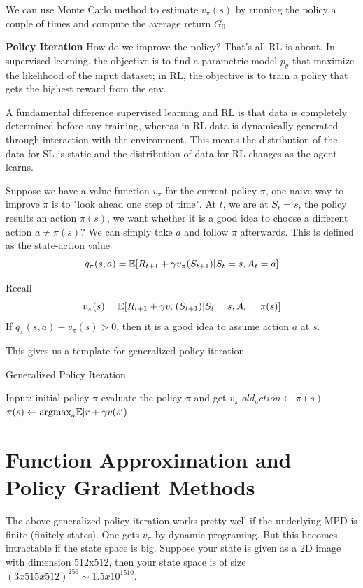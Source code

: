 \documentclass{article}
\begin{document}
We can use Monte Carlo method to estimate $v_{\pi}(s)$ by running the 
policy a couple of times and compute the average return $G_0$. 


\textbf{Policy Iteration} How do we improve the policy? That's all RL is 
about. In supervised learning, the objective is to find a parametric
model $p_{\theta}$ that maximize the likelihood of the input dataset;
in RL, the objective is to train a policy that gets the highest reward
from the env. 

A fundamental difference supervised learning and RL is that data is 
completely determined before any training, whereas in RL data is
dynamically generated through interaction with the environment. 
This means the distribution of the data for SL is static and the 
distribution of data for RL changes as the agent learns. 

Suppose we have a value function $v_{\pi}$ for the current policy $\pi$,
one naive way to improve $\pi$ is to "look ahead one step of time". 
At $t$, we are at $S_t=s$, the policy results an action $\pi(s)$, 
we want whether it 
is a good idea to choose a different action $a \neq \pi(s)$? We can simply
take $a$ and follow $\pi$ afterwards. This is defined as the state-action
value 
\[
    q_{\pi}(s, a) = \mathbb{E}[R_{t+1} + \gamma v_{\pi}(S_{t+1}) | S_t=s, A_t=a]
\]

Recall
\[
    v_{\pi}(s) = \mathbb{E}[R_{t+1} + \gamma v_{\pi}(S_{t+1}) | S_t=s, A_t=\pi(s)]
\]
If $q_{\pi}(s, a) - v_{\pi}(s) > 0$, then it is a good idea to assume 
action $a$ at $s$. 

This gives us a template for generalized policy iteration

\begin{algorithm}[H]
    \caption{Generalized Policy Iteration}
\end{algorithm}

\begin{algorithmic}
    \STATE Input: initial policy $\pi$
    \REPEAT
    \STATE evaluate the policy $\pi$ and get $v_{\pi}$
    \STATE $old_action\leftarrow \pi(s)$
    \STATE $\pi(s) \leftarrow \text{argmax}_a \mathbb{E}[r + \gamma v(s^{\prime})$
    \ENDFOR
\end{algorithmic}

\section{Function Approximation and Policy Gradient Methods}
The above generalized policy iteration works pretty well if the underlying
MPD is finite (finitely states). One gets $v_{\pi}$ by dynamic programing.
But this becomes intractable if the state space is big. Suppose your 
state is given as a 2D image with dimension 512x512, then your state
space is of size $(3x515x512)^{256} \sim 1.5x10^{1510}$. 
\end{document}
